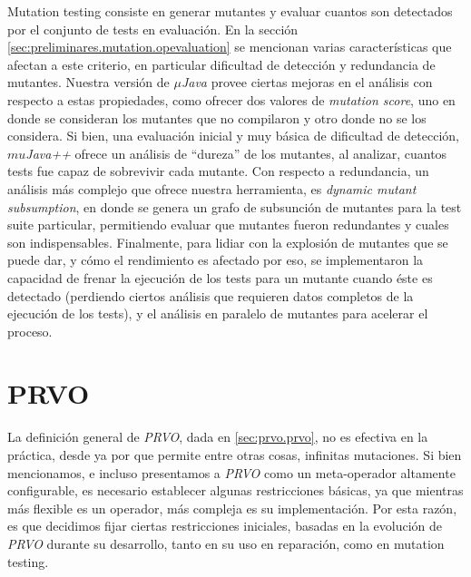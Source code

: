 Mutation testing consiste en generar mutantes y evaluar cuantos son detectados por el conjunto de tests en evaluaci\'on. En la secci\'on \ref{sec:preliminares.mutation.opevaluation} se mencionan varias caracter\'isticas que afectan a este criterio, en particular dificultad de detecci\'on y redundancia de mutantes. Nuestra versi\'on de \emph{$\mu$Java} provee ciertas mejoras en el an\'alisis con respecto a estas propiedades, como ofrecer dos valores de \emph{mutation score}, uno en donde se consideran los mutantes que no compilaron y otro donde no se los considera. Si bien, una evaluaci\'on inicial y muy b\'asica de dificultad de detecci\'on, \emph{$mu$Java++} ofrece un an\'alisis de ``dureza'' de los mutantes, al analizar, cuantos tests fue capaz de sobrevivir cada mutante. Con respecto a redundancia, un an\'alisis m\'as complejo que ofrece nuestra herramienta, es \emph{dynamic mutant subsumption}, en donde se genera un grafo de subsunci\'on de mutantes para la test suite particular, permitiendo evaluar que mutantes fueron redundantes y cuales son indispensables. Finalmente, para lidiar con la explosi\'on de mutantes que se puede dar, y c\'omo el rendimiento es afectado por eso, se implementaron la capacidad de frenar la ejecuci\'on de los tests para un mutante cuando \'este es detectado (perdiendo ciertos an\'alisis que requieren datos completos de la ejecuci\'on de los tests), y el an\'alisis en paralelo de mutantes para acelerar el proceso.

\section{PRVO}
\label{sec:implementation.prvo}

La definici\'on general de \emph{PRVO}, dada en \ref{sec:prvo.prvo}, no es efectiva en la pr\'actica, desde ya por que permite entre otras cosas, infinitas mutaciones. Si bien mencionamos, e incluso presentamos a \emph{PRVO} como un meta-operador altamente configurable, es necesario establecer algunas restricciones b\'asicas, ya que mientras m\'as flexible es un operador, m\'as compleja es su implementaci\'on. Por esta raz\'on, es que decidimos fijar ciertas restricciones iniciales, basadas en la evoluci\'on de \emph{PRVO} durante su desarrollo, tanto en su uso en reparaci\'on, como en mutation testing.

